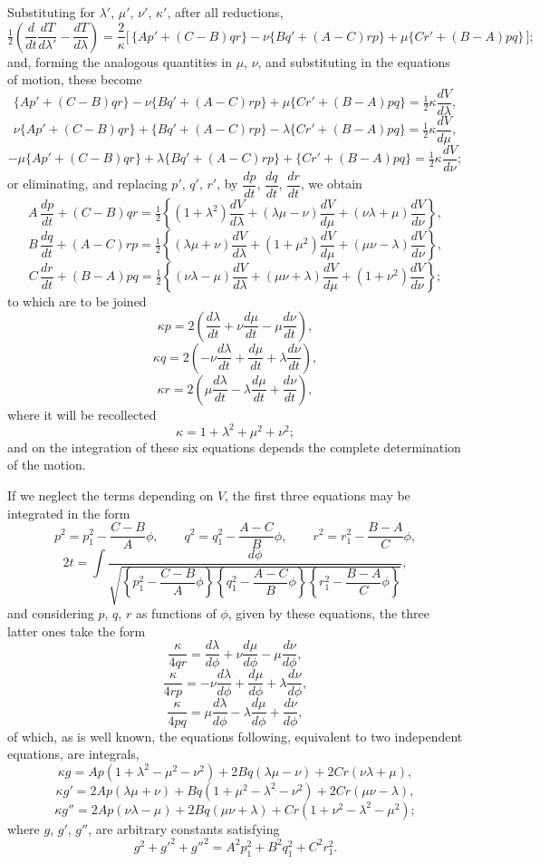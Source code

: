 \documentclass[11pt]{article}
\begin{document}
Substituting for $\lambda'$, $\mu'$, $\nu'$, $\kappa'$, after all reductions,
\[
\tfrac12\left(\frac{d}{dt}\frac{dT}{d\lambda'} - \frac{dT}{d\lambda}\right) = \frac{2}{\kappa}\big[\,\{A p' + (C - B) q r\} - \nu\{B q' + (A - C) r p\} + \mu\{C r' + (B - A) p q\}\,\big];
\]
and, forming the analogous quantities in $\mu$, $\nu$, and substituting in the equations of motion, these become
\[
\{A p' + (C - B) q r\} - \nu\{B q' + (A - C) r p\} + \mu\{C r' + (B - A) p q\} = \tfrac12 \kappa \frac{dV}{d\lambda},
\]
\[
\nu\{A p' + (C - B) q r\} + \{B q' + (A - C) r p\} - \lambda\{C r' + (B - A) p q\} = \tfrac12 \kappa \frac{dV}{d\mu},
\]
\[
-\mu\{A p' + (C - B) q r\} + \lambda\{B q' + (A - C) r p\} + \{C r' + (B - A) p q\} = \tfrac12 \kappa \frac{dV}{d\nu};
\]
or eliminating, and replacing $p'$, $q'$, $r'$, by $\dfrac{dp}{dt}$, $\dfrac{dq}{dt}$, $\dfrac{dr}{dt}$, we obtain
\[
A\,\frac{dp}{dt} + (C - B) q r = \tfrac12\left\{(1 + \lambda^2)\frac{dV}{d\lambda} + (\lambda\mu - \nu)\frac{dV}{d\mu} + (\nu\lambda + \mu)\frac{dV}{d\nu}\right\},
\]
\[
B\,\frac{dq}{dt} + (A - C) r p = \tfrac12\left\{(\lambda\mu + \nu)\frac{dV}{d\lambda} + (1 + \mu^2)\frac{dV}{d\mu} + (\mu\nu - \lambda)\frac{dV}{d\nu}\right\},
\]
\[
C\,\frac{dr}{dt} + (B - A) p q = \tfrac12\left\{(\nu\lambda - \mu)\frac{dV}{d\lambda} + (\mu\nu + \lambda)\frac{dV}{d\mu} + (1 + \nu^2)\frac{dV}{d\nu}\right\};
\]
to which are to be joined
\[
\kappa p = 2\left(\frac{d\lambda}{dt} + \nu\frac{d\mu}{dt} - \mu\frac{d\nu}{dt}\right),
\]
\[
\kappa q = 2\left(-\nu\frac{d\lambda}{dt} + \frac{d\mu}{dt} + \lambda\frac{d\nu}{dt}\right),
\]
\[
\kappa r = 2\left(\mu\frac{d\lambda}{dt} - \lambda\frac{d\mu}{dt} + \frac{d\nu}{dt}\right),
\]
where it will be recollected
\[
\kappa = 1 + \lambda^2 + \mu^2 + \nu^2;
\]
and on the integration of these six equations depends the complete determination of the motion.

If we neglect the terms depending on $V$, the first three equations may be integrated in the form
\[
p^2 = p_1^2 - \frac{C - B}{A}\phi, \qquad q^2 = q_1^2 - \frac{A - C}{B}\phi, \qquad r^2 = r_1^2 - \frac{B - A}{C}\phi,
\]
\[
2 t = \int \frac{d\phi}{\sqrt{\left\{p_1^2 - \dfrac{C - B}{A}\phi\right\}\left\{q_1^2 - \dfrac{A - C}{B}\phi\right\}\left\{r_1^2 - \dfrac{B - A}{C}\phi\right\}}},
\]
and considering $p$, $q$, $r$ as functions of $\phi$, given by these equations, the three latter ones take the form
\[
\frac{\kappa}{4 q r} = \frac{d\lambda}{d\phi} + \nu\frac{d\mu}{d\phi} - \mu\frac{d\nu}{d\phi},
\]
\[
\frac{\kappa}{4 r p} = -\nu\frac{d\lambda}{d\phi} + \frac{d\mu}{d\phi} + \lambda\frac{d\nu}{d\phi},
\]
\[
\frac{\kappa}{4 p q} = \mu\frac{d\lambda}{d\phi} - \lambda\frac{d\mu}{d\phi} + \frac{d\nu}{d\phi},
\]
of which, as is well known, the equations following, equivalent to two independent equations, are integrals,
\[
\kappa g  = A p(1 + \lambda^2 - \mu^2 - \nu^2) + 2 B q(\lambda\mu - \nu) + 2 C r(\nu\lambda + \mu),
\]
\[
\kappa g' = 2 A p(\lambda\mu + \nu) + B q(1 + \mu^2 - \lambda^2 - \nu^2) + 2 C r(\mu\nu - \lambda),
\]
\[
\kappa g''= 2 A p(\nu\lambda - \mu) + 2 B q(\mu\nu + \lambda) + C r(1 + \nu^2 - \lambda^2 - \mu^2);
\]
where $g$, $g'$, $g''$, are arbitrary constants satisfying
\[
g^2 + g'^2 + g''^2 = A^2 p_1^2 + B^2 q_1^2 + C^2 r_1^2.
\]
\end{document}
